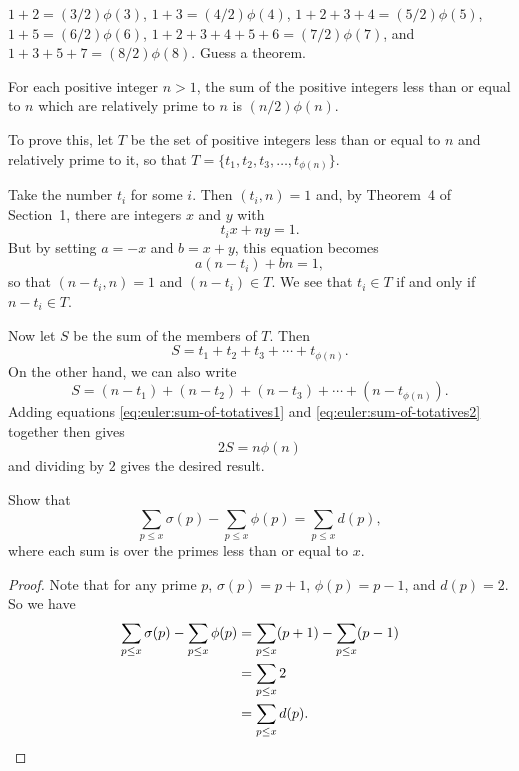  $1 + 2 = (3/2)\phi(3)$, $1 + 3 = (4/2)\phi(4)$,
$1 + 2 + 3 + 4 = (5/2)\phi(5)$, $1 + 5 = (6/2)\phi(6)$,
$1 + 2 + 3 + 4 + 5 + 6 = (7/2)\phi(7)$, and
$1 + 3 + 5 + 7 = (8/2)\phi(8)$. Guess a theorem.
\begin{solution}
  For each positive integer $n > 1$, the sum of the positive integers
  less than or equal to $n$ which are relatively prime to $n$ is
  $(n/2)\phi(n)$.

  To prove this, let $T$ be the set of positive integers less than or
  equal to $n$ and relatively prime to it, so that
  $T = \{t_1,t_2,t_3,\dots,t_{\phi(n)}\}$.

  Take the number $t_i$ for some $i$. Then $(t_i,n) = 1$ and, by
  Theorem~4 of Section~1, there are integers $x$ and $y$ with
  \begin{equation*}
    t_ix + ny = 1.
  \end{equation*}
  But by setting $a = -x$ and $b = x + y$, this equation becomes
  \begin{equation*}
    a(n - t_i) + bn = 1,
  \end{equation*}
  so that $(n - t_i, n) = 1$ and $(n - t_i)\in T$. We see that
  $t_i\in T$ if and only if $n - t_i\in T$.

  Now let $S$ be the sum of the members of $T$. Then
  \begin{equation}
    \label{eq:euler:sum-of-totatives1}
    S = t_1 + t_2 + t_3 + \cdots + t_{\phi(n)}.
  \end{equation}
  On the other hand, we can also write
  \begin{equation}
    \label{eq:euler:sum-of-totatives2}
    S = (n - t_1) + (n - t_2) + (n - t_3) + \cdots + (n - t_{\phi(n)}).
  \end{equation}
  Adding equations \eqref{eq:euler:sum-of-totatives1} and
  \eqref{eq:euler:sum-of-totatives2} together then gives
  \begin{equation*}
    2S = n\phi(n)
  \end{equation*}
  and dividing by $2$ gives the desired result.
\end{solution}

 Show that
\begin{equation*}
  \sum_{p\leq x}\sigma(p) - \sum_{p\leq x}\phi(p) = \sum_{p\leq x}d(p),
\end{equation*}
where each sum is over the primes less than or equal to $x$.
\begin{proof}
  Note that for any prime $p$, $\sigma(p) = p + 1$, $\phi(p) = p - 1$,
  and $d(p) = 2$. So we have
  \begin{align*}
    \sum_{p\leq x}\sigma(p) - \sum_{p\leq x}\phi(p)
    &= \sum_{p\leq x}(p + 1) - \sum_{p\leq x}(p - 1) \\
    &= \sum_{p\leq x}2 \\
    &= \sum_{p\leq x}d(p). \qedhere
  \end{align*}
\end{proof}

